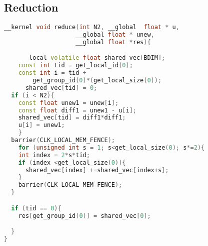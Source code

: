 \documentclass[11pt]{article}
\begin{document}
\subsection{Reduction}
\begin{lstlisting}[language = C++]
__kernel void reduce(int N2, __global  float * u, 
					__global float * unew, 
					__global float *res){

 	 __local volatile float shared_vec[BDIM];
  	const int tid = get_local_id(0);
  	const int i = tid + 
  		get_group_id(0)*(get_local_size(0));
  	  shared_vec[tid] = 0;
  if (i < N2){
    const float unew1 = unew[i];
    const float diff1 = unew1 - u[i];
    shared_vec[tid] = diff1*diff1;
    u[i] = unew1;
    }
  barrier(CLK_LOCAL_MEM_FENCE);
    for (unsigned int s = 1; s<get_local_size(0); s*=2){
    int index = 2*s*tid;
    if (index <get_local_size(0)){
      shared_vec[index] +=shared_vec[index+s];
    }
    barrier(CLK_LOCAL_MEM_FENCE);
  }

  if (tid == 0){
    res[get_group_id(0)] = shared_vec[0];

  }
}
\end{lstlisting}
\end{document}
